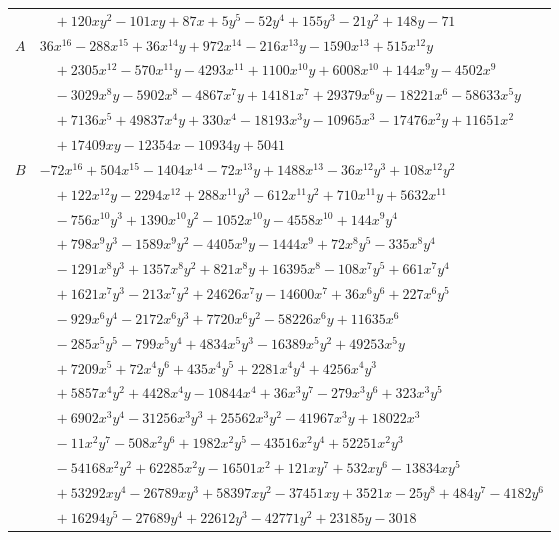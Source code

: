 \documentclass[11pt]{article}
\begin{document}
\begin{longtable}{@{}ll@{}}
 & $\quad +120xy^{2}-101xy+87x+5y^{5}-52y^{4}+155y^{3}-21y^{2}+148y-71$\\
$A$ & $36x^{16}-288x^{15}+36x^{14}y+972x^{14}-216x^{13}y-1590x^{13}+515x^{12}y$\\
 & $\quad +2305x^{12}-570x^{11}y-4293x^{11}+1100x^{10}y+6008x^{10}+144x^{9}y-4502x^{9}$\\
 & $\quad -3029x^{8}y-5902x^{8}-4867x^{7}y+14181x^{7}+29379x^{6}y-18221x^{6}-58633x^{5}y$\\
 & $\quad +7136x^{5}+49837x^{4}y+330x^{4}-18193x^{3}y-10965x^{3}-17476x^{2}y+11651x^{2}$\\
 & $\quad +17409xy-12354x-10934y+5041$\\
$B$ & $-72x^{16}+504x^{15}-1404x^{14}-72x^{13}y+1488x^{13}-36x^{12}y^{3}+108x^{12}y^{2}$\\
 & $\quad +122x^{12}y-2294x^{12}+288x^{11}y^{3}-612x^{11}y^{2}+710x^{11}y+5632x^{11}$\\
 & $\quad -756x^{10}y^{3}+1390x^{10}y^{2}-1052x^{10}y-4558x^{10}+144x^{9}y^{4}$\\
 & $\quad +798x^{9}y^{3}-1589x^{9}y^{2}-4405x^{9}y-1444x^{9}+72x^{8}y^{5}-335x^{8}y^{4}$\\
 & $\quad -1291x^{8}y^{3}+1357x^{8}y^{2}+821x^{8}y+16395x^{8}-108x^{7}y^{5}+661x^{7}y^{4}$\\
 & $\quad +1621x^{7}y^{3}-213x^{7}y^{2}+24626x^{7}y-14600x^{7}+36x^{6}y^{6}+227x^{6}y^{5}$\\
 & $\quad -929x^{6}y^{4}-2172x^{6}y^{3}+7720x^{6}y^{2}-58226x^{6}y+11635x^{6}$\\
 & $\quad -285x^{5}y^{5}-799x^{5}y^{4}+4834x^{5}y^{3}-16389x^{5}y^{2}+49253x^{5}y$\\
 & $\quad +7209x^{5}+72x^{4}y^{6}+435x^{4}y^{5}+2281x^{4}y^{4}+4256x^{4}y^{3}$\\
 & $\quad +5857x^{4}y^{2}+4428x^{4}y-10844x^{4}+36x^{3}y^{7}-279x^{3}y^{6}+323x^{3}y^{5}$\\
 & $\quad +6902x^{3}y^{4}-31256x^{3}y^{3}+25562x^{3}y^{2}-41967x^{3}y+18022x^{3}$\\
 & $\quad -11x^{2}y^{7}-508x^{2}y^{6}+1982x^{2}y^{5}-43516x^{2}y^{4}+52251x^{2}y^{3}$\\
 & $\quad -54168x^{2}y^{2}+62285x^{2}y-16501x^{2}+121xy^{7}+532xy^{6}-13834xy^{5}$\\
 & $\quad +53292xy^{4}-26789xy^{3}+58397xy^{2}-37451xy+3521x-25y^{8}+484y^{7}-4182y^{6}$\\
 & $\quad +16294y^{5}-27689y^{4}+22612y^{3}-42771y^{2}+23185y-3018$\\

\end{longtable}
\end{document}
